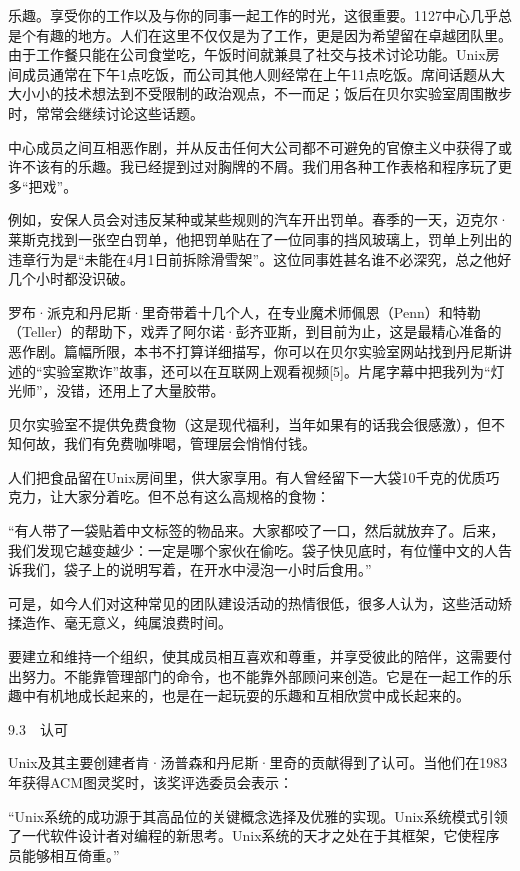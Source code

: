 \documentclass[a4paper,12pt,UTF8,twoside]{ctexbook}
\begin{document}
{{乐趣。享受你的工作以及与你的同事一起工作的时光，这很重要。1127中心几乎总是个有趣的地方。人们在这里不仅仅是为了工作，更是因为希望留在卓越团队里。由于工作餐只能在公司食堂吃，午饭时间就兼具了社交与技术讨论功能。Unix房间成员通常在下午1点吃饭，而公司其他人则经常在上午11点吃饭。席间话题从大大小小的技术想法到不受限制的政治观点，不一而足；饭后在贝尔实验室周围散步时，常常会继续讨论这些话题。

中心成员之间互相恶作剧，并从反击任何大公司都不可避免的官僚主义中获得了或许不该有的乐趣。我已经提到过对胸牌的不屑。我们用各种工作表格和程序玩了更多“把戏”。

例如，安保人员会对违反某种或某些规则的汽车开出罚单。春季的一天，迈克尔·莱斯克找到一张空白罚单，他把罚单贴在了一位同事的挡风玻璃上，罚单上列出的违章行为是“未能在4月1日前拆除滑雪架”。这位同事姓甚名谁不必深究，总之他好几个小时都没识破。

罗布·派克和丹尼斯·里奇带着十几个人，在专业魔术师佩恩（Penn）和特勒（Teller）的帮助下，戏弄了阿尔诺·彭齐亚斯，到目前为止，这是最精心准备的恶作剧。篇幅所限，本书不打算详细描写，你可以在贝尔实验室网站找到丹尼斯讲述的“实验室欺诈”故事，还可以在互联网上观看视频[5]。片尾字幕中把我列为“灯光师”，没错，还用上了大量胶带。

贝尔实验室不提供免费食物（这是现代福利，当年如果有的话我会很感激），但不知何故，我们有免费咖啡喝，管理层会悄悄付钱。

人们把食品留在Unix房间里，供大家享用。有人曾经留下一大袋10千克的优质巧克力，让大家分着吃。但不总有这么高规格的食物：

“有人带了一袋贴着中文标签的物品来。大家都咬了一口，然后就放弃了。后来，我们发现它越变越少：一定是哪个家伙在偷吃。袋子快见底时，有位懂中文的人告诉我们，袋子上的说明写着，在开水中浸泡一小时后食用。”



可是，如今人们对这种常见的团队建设活动的热情很低，很多人认为，这些活动矫揉造作、毫无意义，纯属浪费时间。

要建立和维持一个组织，使其成员相互喜欢和尊重，并享受彼此的陪伴，这需要付出努力。不能靠管理部门的命令，也不能靠外部顾问来创造。它是在一起工作的乐趣中有机地成长起来的，也是在一起玩耍的乐趣和互相欣赏中成长起来的。





9.3　认可


Unix及其主要创建者肯·汤普森和丹尼斯·里奇的贡献得到了认可。当他们在1983年获得ACM图灵奖时，该奖评选委员会表示：

“Unix系统的成功源于其高品位的关键概念选择及优雅的实现。Unix系统模式引领了一代软件设计者对编程的新思考。Unix系统的天才之处在于其框架，它使程序员能够相互倚重。”



}}
\end{document}
